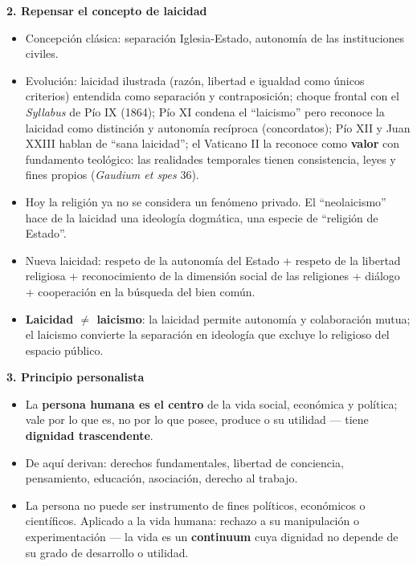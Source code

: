 \documentclass[10pt,a4paper]{article}
\begin{document}
\medskip\noindent \textbf{2. Repensar el concepto de laicidad}\par\nopagebreak
\begin{itemize}
\item Concepción clásica: separación Iglesia-Estado, autonomía de las instituciones civiles.
\item Evolución: laicidad ilustrada (razón, libertad e igualdad como únicos criterios) entendida como separación y contraposición; choque frontal con el \textit{Syllabus} de Pío IX (1864); Pío XI condena el ``laicismo'' pero reconoce la laicidad como distinción y autonomía recíproca (concordatos); Pío XII y Juan XXIII hablan de ``sana laicidad''; el Vaticano II la reconoce como \textbf{valor} con fundamento teológico: las realidades temporales tienen consistencia, leyes y fines propios (\textit{Gaudium et spes} 36).
\item Hoy la religión ya no se considera un fenómeno privado. El ``neolaicismo'' hace de la laicidad una ideología dogmática, una especie de ``religión de Estado''.
\item Nueva laicidad: respeto de la autonomía del Estado + respeto de la libertad religiosa + reconocimiento de la dimensión social de las religiones + diálogo + cooperación en la búsqueda del bien común.
\item \textbf{Laicidad $\neq$ laicismo}: la laicidad permite autonomía y colaboración mutua; el laicismo convierte la separación en ideología que excluye lo religioso del espacio público.
\end{itemize}

\medskip\noindent \textbf{3. Principio personalista}\par\nopagebreak
\begin{itemize}
\item La \textbf{persona humana es el centro} de la vida social, económica y política; vale por lo que es, no por lo que posee, produce o su utilidad --- tiene \textbf{dignidad trascendente}.
\item De aquí derivan: derechos fundamentales, libertad de conciencia, pensamiento, educación, asociación, derecho al trabajo.
\item La persona no puede ser instrumento de fines políticos, económicos o científicos. Aplicado a la vida humana: rechazo a su manipulación o experimentación --- la vida es un \textbf{continuum} cuya dignidad no depende de su grado de desarrollo o utilidad.
\end{itemize}
\end{document}
